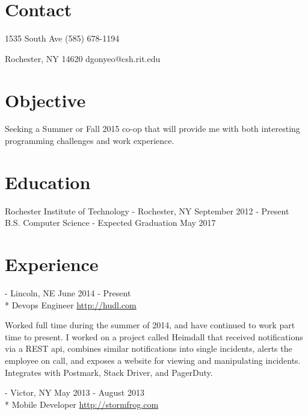 \documentclass[letterpaper,margin,line,11pt]{resume}
\newcommand{\rurl}[1]{\hfill {\footnotesize \url{#1}}}
\newcommand{\rdate}[1]{\hfill {\small #1}}
\renewcommand{\employer}[5]{\item[#1] - #2 \rdate{#3} \\* #4 \rurl{#5}}
\begin{document}
\begin{resume}
\section{\mysidestyle Contact} 
    \begin{asparablank}
        \item 1535 South Ave \hfill (585) 678-1194
        \item Rochester, NY 14620 \hfill dgonyeo@csh.rit.edu
    \end{asparablank}

\section{\mysidestyle Objective}
    Seeking a Summer or Fall 2015 co-op that will provide me with both interesting programming challenges and work experience.

\section{\mysidestyle Education}
    \begin{compactdesc}
        \item[Rochester Institute of Technology] - Rochester, NY \rdate{September 2012 - Present}
        \small
        \\B.S. Computer Science  - Expected Graduation May 2017
    \end{compactdesc}

\section{\mysidestyle Experience}
    \begin{asparadesc}
        \employer{Hudl}{Lincoln, NE}{June 2014 - Present}{Devops Engineer}{http://hudl.com}

        \small
        Worked full time during the summer of 2014, and have continued to work part time to present. I worked on a project called Heimdall that received notifications via a REST api, combines similar notifications into single incidents, alerts the employee on call, and exposes a website for viewing and manipulating incidents. Integrates with Postmark, Stack Driver, and PagerDuty.
        \normalsize
        \\
        \employer{Stormfrog}{Victor, NY}{May 2013 - August 2013}{Mobile Developer}{http://stormfrog.com}


\end{asparadesc}
\end{resume}
\end{document}

